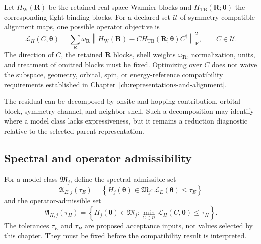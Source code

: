 Let $H_{\mathrm W}(\mathbf R)$ be the retained real-space Wannier blocks and
$H_{\mathrm{TB}}(\mathbf R;\boldsymbol\theta)$ the corresponding tight-binding
blocks. For a declared set $\mathcal U$ of symmetry-compatible alignment maps,
one possible operator objective is
\begin{equation}
  \mathcal L_H(C,\boldsymbol\theta)
  =
  \sum_{\mathbf R}\omega_{\mathbf R}
  \left\|
    H_{\mathrm W}(\mathbf R)
    -C H_{\mathrm{TB}}(\mathbf R;\boldsymbol\theta)C^{\dagger}
  \right\|_{\mathrm F}^{2},
  \qquad C\in\mathcal U.
\end{equation}
The direction of $C$, the retained $\mathbf R$ blocks, shell weights
$\omega_{\mathbf R}$, normalization, units, and treatment of omitted blocks
must be fixed. Optimizing over $C$ does not waive the subspace, geometry,
orbital, spin, or energy-reference compatibility requirements established in
Chapter~\ref{ch:representations-and-alignment}.

The residual can be decomposed by onsite and hopping contribution, orbital
block, symmetry channel, and neighbor shell. Such a decomposition may identify
where a model class lacks expressiveness, but it remains a reduction diagnostic
relative to the selected parent representation.

\subsection{Spectral and operator admissibility}


For a model class $\mathfrak M_j$, define the spectral-admissible set
\begin{equation}
  \mathfrak A_{E,j}(\tau_E)
  =
  \left\{
    H_j(\boldsymbol\theta)\in\mathfrak M_j:
    \mathcal L_E(\boldsymbol\theta)\leq\tau_E
  \right\}
\end{equation}
and the operator-admissible set
\begin{equation}
  \mathfrak A_{H,j}(\tau_H)
  =
  \left\{
    H_j(\boldsymbol\theta)\in\mathfrak M_j:
    \min_{C\in\mathcal U}\mathcal L_H(C,\boldsymbol\theta)
    \leq\tau_H
  \right\}.
\end{equation}
The tolerances $\tau_E$ and $\tau_H$ are proposed acceptance inputs, not values
selected by this chapter. They must be fixed before the compatibility result is
interpreted.

